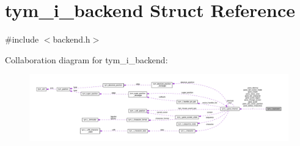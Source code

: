 \hypertarget{structtym__i__backend}{}\section{tym\+\_\+i\+\_\+backend Struct Reference}
\label{structtym__i__backend}


{\ttfamily \#include $<$backend.\+h$>$}



Collaboration diagram for tym\+\_\+i\+\_\+backend\+:
\nopagebreak
\begin{figure}[H]
\begin{center}
\leavevmode
\includegraphics[width=350pt]{structtym__i__backend__coll__graph}
\end{center}
\end{figure}
